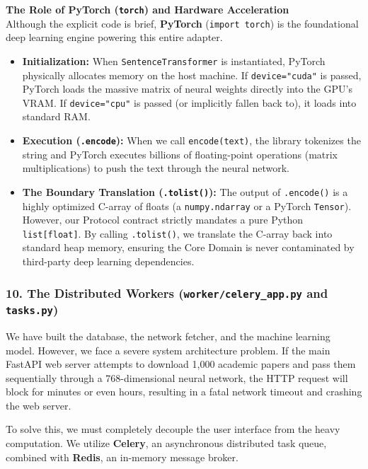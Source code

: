 \textbf{The Role of PyTorch (\texttt{torch}) and Hardware Acceleration} \\
Although the explicit code is brief, \textbf{PyTorch} (\texttt{import torch}) is the foundational deep learning engine powering this entire adapter.
\begin{itemize}
    \item \textbf{Initialization:} When \texttt{SentenceTransformer} is instantiated, PyTorch physically allocates memory on the host machine. If \texttt{device="cuda"} is passed, PyTorch loads the massive matrix of neural weights directly into the GPU's VRAM. If \texttt{device="cpu"} is passed (or implicitly fallen back to), it loads into standard RAM.
    \item \textbf{Execution (\texttt{.encode}):} When we call \texttt{encode(text)}, the library tokenizes the string and PyTorch executes billions of floating-point operations (matrix multiplications) to push the text through the neural network.
    \item \textbf{The Boundary Translation (\texttt{.tolist()}):} The output of \texttt{.encode()} is a highly optimized C-array of floats (a \texttt{numpy.ndarray} or a PyTorch \texttt{Tensor}). However, our Protocol contract strictly mandates a pure Python \texttt{list[float]}. By calling \texttt{.tolist()}, we translate the C-array back into standard heap memory, ensuring the Core Domain is never contaminated by third-party deep learning dependencies.
\end{itemize}





\subsubsection*{10. The Distributed Workers (\texttt{worker/celery\_app.py} and \texttt{tasks.py})}

We have built the database, the network fetcher, and the machine learning model. However, we face a severe system architecture problem. If the main FastAPI web server attempts to download 1,000 academic papers and pass them sequentially through a 768-dimensional neural network, the HTTP request will block for minutes or even hours, resulting in a fatal network timeout and crashing the web server.

To solve this, we must completely decouple the user interface from the heavy computation. We utilize \textbf{Celery}, an asynchronous distributed task queue, combined with \textbf{Redis}, an in-memory message broker.

